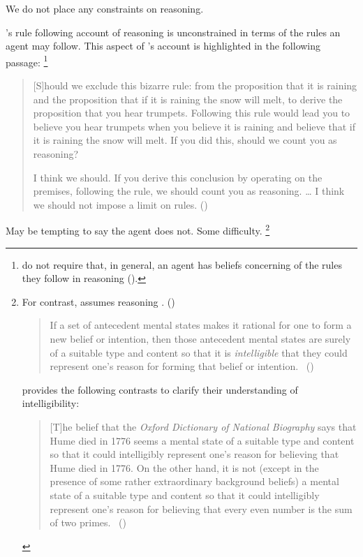 \begin{note}
  We do not place any constraints on reasoning.

  \citeauthor{Broome:2013aa}'s rule following account of reasoning is unconstrained in terms of the rules an agent may follow.
  This aspect  of \citeauthor{Broome:2013aa}'s account is highlighted in the following passage:%
  \footnote{
     \citeauthor{Broome:2013aa} do not require that, in general, an agent has beliefs concerning of the rules they follow in reasoning (\citeyear[cf.][\S13.2]{Broome:2013aa}).
  }

  \begin{quote}
    [S]hould we exclude this bizarre rule: from the proposition that it is raining and the proposition that if it is raining the snow will melt, to derive the proposition that you hear trumpets.
    Following this rule would lead you to believe you hear trumpets when you believe it is raining and believe that if it is raining the snow will melt.
    If you did this, should we count you as reasoning?

    I think we should.
    If you derive this conclusion by operating on the premises, following the rule, we should count you as reasoning.
    \dots
    I think we should not impose a limit on rules.%
    \mbox{}\hfill\mbox{(\citeyear[233]{Broome:2013aa})}
  \end{quote}

  May be tempting to say the agent does not.
  Some difficulty.%
  \footnote{
    For contrast, \citeauthor{Wedgwood:2006ui} assumes reasoning .%
    (\citeyear[600]{Wedgwood:2006ui})

   \begin{quote}
    If a set of antecedent mental states makes it rational for one to form a new belief or intention, then those antecedent mental states are surely of a suitable type and content so that it is \emph{intelligible} that they could represent one's reason for forming that belief or intention.%
    \mbox{ }\hfill\mbox{(\citeyear[662]{Wedgwood:2006ui})}
  \end{quote}

   \citeauthor{Wedgwood:2006ui} provides the following contrasts to clarify their understanding of intelligibility:

  \begin{quote}
    [T]he belief that the \emph{Oxford Dictionary of National Biography} says that Hume died in 1776 seems a mental state of a suitable type and content so that it could intelligibly represent one's reason for believing that Hume died in 1776.
    On the other hand, it is not (except in the presence of some rather extraordinary background beliefs) a mental state of a suitable type and content so that it could intelligibly represent one's reason for believing that every even number is the sum of two primes.%
    \mbox{ }\hfill\mbox{(\citeyear[662]{Wedgwood:2006ui})}
  \end{quote}

}
\end{note}
